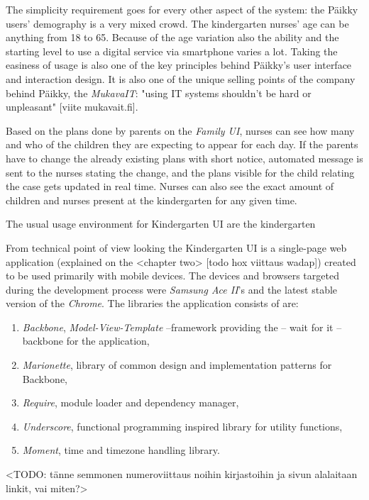 The simplicity requirement goes for every other aspect of the system: the Päikky users' demography is a very mixed crowd. The kindergarten nurses' age can be anything from 18 to 65. Because of the age variation also the ability and the starting level to use a digital service via smartphone varies a lot. Taking the easiness of usage is also one of the key principles behind Päikky's user interface and interaction design. It is also one of the unique selling points of the company behind Päikky, the \textit{MukavaIT}: "using IT systems shouldn't be hard or unpleasant" [viite mukavait.fi].

Based on the plans done by parents on the \textit{Family UI}, nurses can see how many and who of the children they are expecting to appear for each day. If the parents have to change the already existing plans with short notice, automated message is sent to the nurses stating the change, and the plans visible for the child relating the case gets updated in real time. Nurses can also see the exact amount of children and nurses present at the kindergarten for any given time.

The usual usage environment for Kindergarten UI are the kindergarten

From technical point of view looking the Kindergarten UI is a single-page web application (explained on the <chapter two> [todo hox viittaus wadap]) created to be used primarily with mobile devices. The devices and browsers targeted during the development process were \textit{Samsung Ace II}'s and the latest stable version of the \textit{Chrome}. The libraries the application consists of are: %

\begin{enumerate}
	\item \textit{Backbone}, \textit{Model-View-Template} –framework providing the – wait for it – backbone for the application,
	\item \textit{Marionette}, library of common design and implementation patterns for Backbone,
	\item \textit{Require}, module loader and dependency manager,
	\item \textit{Underscore}, functional programming inspired library for utility functions,
	\item \textit{Moment}, time and timezone handling library. 
\end{enumerate}

<TODO: tänne semmonen numeroviittaus noihin kirjastoihin ja sivun alalaitaan linkit, vai miten?>





